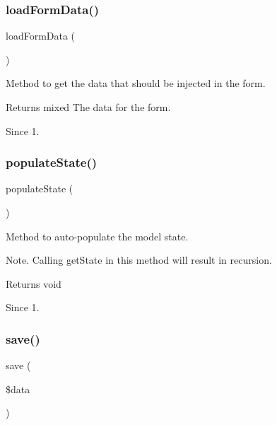 \subsubsection{load\+Form\+Data()}
{\footnotesize\ttfamily load\+Form\+Data (\begin{DoxyParamCaption}{ }\end{DoxyParamCaption})\hspace{0.3cm}{\ttfamily [protected]}}

Method to get the data that should be injected in the form.

\begin{DoxyReturn}{Returns}
mixed The data for the form.
\end{DoxyReturn}
\begin{DoxySince}{Since}
1. 
\end{DoxySince}
\mbox{\label{classtks__agenda_model_item_scrap_form_a27b9842357535d8b4451234ff61d99a2}} 
\subsubsection{populate\+State()}
{\footnotesize\ttfamily populate\+State (\begin{DoxyParamCaption}{ }\end{DoxyParamCaption})\hspace{0.3cm}{\ttfamily [protected]}}

Method to auto-\/populate the model state.

Note. Calling get\+State in this method will result in recursion.

\begin{DoxyReturn}{Returns}
void
\end{DoxyReturn}
\begin{DoxySince}{Since}
1. 
\end{DoxySince}
\mbox{\label{classtks__agenda_model_item_scrap_form_ac5859a5507d2065c0e6d46b76c8221d1}} 
\subsubsection{save()}
{\footnotesize\ttfamily save (\begin{DoxyParamCaption}\item[{}]{\$data }\end{DoxyParamCaption})}

